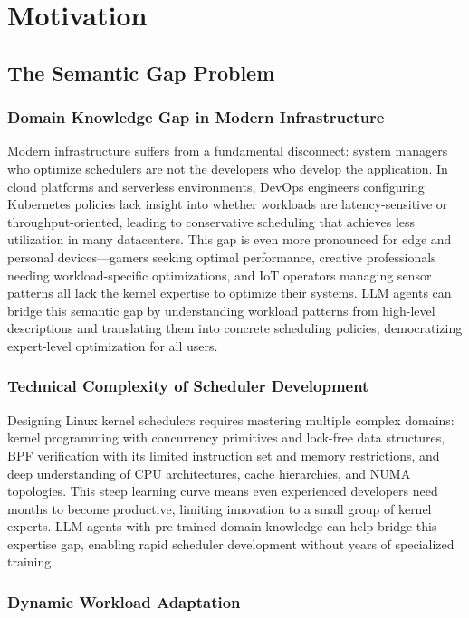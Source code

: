 \section{Motivation}

\subsection{The Semantic Gap Problem}

\subsubsection{Domain Knowledge Gap in Modern Infrastructure}

Modern infrastructure suffers from a fundamental disconnect: system managers who optimize schedulers are not the developers who develop the application. In cloud platforms and serverless environments, DevOps engineers configuring Kubernetes policies lack insight into whether workloads are latency-sensitive or throughput-oriented, leading to conservative scheduling that achieves less utilization in many datacenters. This gap is even more pronounced for edge and personal devices—gamers seeking optimal performance, creative professionals needing workload-specific optimizations, and IoT operators managing sensor patterns all lack the kernel expertise to optimize their systems. LLM agents can bridge this semantic gap by understanding workload patterns from high-level descriptions and translating them into concrete scheduling policies, democratizing expert-level optimization for all users.

\subsubsection{Technical Complexity of Scheduler Development}

Designing Linux kernel schedulers requires mastering multiple complex domains: kernel programming with concurrency primitives and lock-free data structures, BPF verification with its limited instruction set and memory restrictions, and deep understanding of CPU architectures, cache hierarchies, and NUMA topologies. This steep learning curve means even experienced developers need months to become productive, limiting innovation to a small group of kernel experts. LLM agents with pre-trained domain knowledge can help bridge this expertise gap, enabling rapid scheduler development without years of specialized training.

\subsubsection{Dynamic Workload Adaptation}

